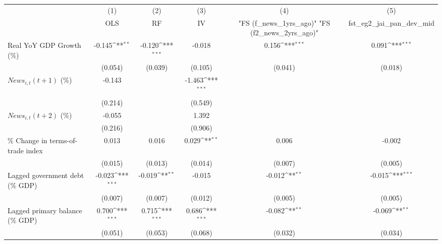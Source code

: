 {
\def\sym#1{\ifmmode^{#1}\else\(^{#1}\)\fi}
\begin{tabular}{l*{5}{c}}
\toprule
                    &\multicolumn{1}{c}{(1)}&\multicolumn{1}{c}{(2)}&\multicolumn{1}{c}{(3)}&\multicolumn{1}{c}{(4)}&\multicolumn{1}{c}{(5)}\\
                    &\multicolumn{1}{c}{OLS}&\multicolumn{1}{c}{RF}&\multicolumn{1}{c}{IV}&\multicolumn{1}{c}{ "FS (f_news_1yrs_ago)"  "FS (f2_news_2yrs_ago)" }&\multicolumn{1}{c}{fst_eg2_jai_pan_dev_mid}\\
\midrule
Real YoY GDP Growth (\%)&      -0.145\sym{**} &      -0.120\sym{***}&      -0.018         &       0.156\sym{***}&       0.091\sym{***}\\
                    &     (0.054)         &     (0.039)         &     (0.105)         &     (0.041)         &     (0.018)         \\
\addlinespace
$ News_{i,t}(t+1)$ (\%)&      -0.143         &                     &      -1.463\sym{***}&                     &                     \\
                    &     (0.214)         &                     &     (0.549)         &                     &                     \\
\addlinespace
$ News_{i,t}(t+2)$ (\%)&      -0.055         &                     &       1.392         &                     &                     \\
                    &     (0.216)         &                     &     (0.906)         &                     &                     \\
\addlinespace
\% Change in terms-of-trade index&       0.013         &       0.016         &       0.029\sym{**} &       0.006         &      -0.002         \\
                    &     (0.015)         &     (0.013)         &     (0.014)         &     (0.007)         &     (0.005)         \\
\addlinespace
Lagged government debt (\% GDP)&      -0.023\sym{***}&      -0.019\sym{**} &      -0.015         &      -0.012\sym{**} &      -0.015\sym{***}\\
                    &     (0.007)         &     (0.007)         &     (0.012)         &     (0.005)         &     (0.005)         \\
\addlinespace
Lagged primary balance (\% GDP)&       0.700\sym{***}&       0.715\sym{***}&       0.686\sym{***}&      -0.082\sym{**} &      -0.069\sym{**} \\
                    &     (0.051)         &     (0.053)         &     (0.068)         &     (0.032)         &     (0.034)         \\

\end{tabular}}
